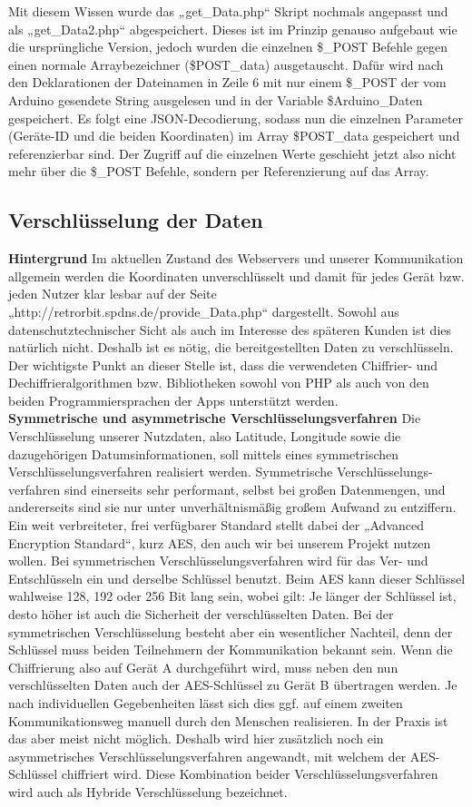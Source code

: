 Mit diesem Wissen wurde das „get\_Data.php“ Skript nochmals angepasst und als „get\_Data2.php“ abgespeichert. Dieses ist im Prinzip genauso aufgebaut wie die ursprüngliche Version, jedoch wurden die einzelnen \$\_POST Befehle gegen einen normale Arraybezeichner (\$POST\_data) ausgetauscht. Dafür wird nach den Deklarationen der Dateinamen in Zeile 6 mit nur einem  \$\_POST der vom Arduino gesendete String ausgelesen und in der Variable \$Arduino\_Daten gespeichert. Es folgt eine JSON-Decodierung, sodass nun die einzelnen Parameter (Geräte-ID und die beiden Koordinaten) im Array \$POST\_data gespeichert und referenzierbar sind. Der Zugriff auf die einzelnen Werte geschieht jetzt also nicht mehr über die \$\_POST Befehle, sondern per Referenzierung auf das Array.

\subsection{Verschlüsselung der Daten}
\textbf{Hintergrund }Im aktuellen Zustand des Webservers und unserer Kommunikation allgemein werden die Koordinaten unverschlüsselt und damit für jedes Gerät bzw. jeden Nutzer klar lesbar auf der Seite „http://retrorbit.spdns.de/provide\_Data.php“ dargestellt. Sowohl aus datenschutztechnischer Sicht als auch im Interesse des späteren Kunden ist dies natürlich nicht. Deshalb ist es nötig, die bereitgestellten Daten zu verschlüsseln. Der wichtigste Punkt an dieser Stelle ist, dass die verwendeten Chiffrier- und Dechiffrieralgorithmen bzw. Bibliotheken sowohl von PHP als auch von den beiden Programmiersprachen der Apps unterstützt werden.
\\
\textbf{Symmetrische und asymmetrische Verschlüsselungsverfahren }Die Verschlüsselung unserer Nutzdaten, also Latitude, Longitude sowie die dazugehörigen Datumsinformationen, soll mittels eines symmetrischen Verschlüsselungsverfahren realisiert werden. Symmetrische Verschlüsselungs-verfahren sind einerseits sehr performant, selbst bei großen Datenmengen, und andererseits sind sie nur unter unverhältnismäßig großem Aufwand zu entziffern. Ein weit verbreiteter, frei verfügbarer Standard stellt dabei der „Advanced Encryption Standard“, kurz AES, den auch wir bei unserem Projekt nutzen wollen. Bei symmetrischen Verschlüsselungsverfahren wird für das Ver- und Entschlüsseln ein und derselbe Schlüssel benutzt. Beim AES kann dieser Schlüssel wahlweise 128, 192 oder 256 Bit lang sein, wobei gilt: Je länger der Schlüssel ist, desto höher ist auch die Sicherheit der verschlüsselten Daten. Bei der symmetrischen Verschlüsselung besteht aber ein wesentlicher Nachteil, denn der Schlüssel muss beiden Teilnehmern der Kommunikation bekannt sein. Wenn die Chiffrierung also auf Gerät A durchgeführt wird, muss neben den nun verschlüsselten Daten auch der AES-Schlüssel zu Gerät B übertragen werden. Je nach individuellen Gegebenheiten lässt sich dies ggf. auf einem zweiten Kommunikationsweg manuell durch den Menschen realisieren. In der Praxis ist das aber meist nicht möglich. Deshalb wird hier zusätzlich noch ein asymmetrisches Verschlüsselungsverfahren angewandt, mit welchem der AES-Schlüssel chiffriert wird. Diese Kombination beider Verschlüsselungsverfahren wird auch als Hybride Verschlüsselung bezeichnet.
